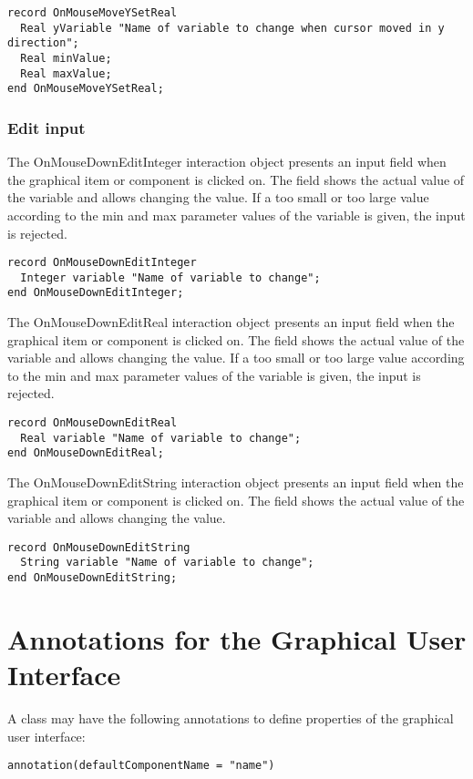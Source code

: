 \begin{lstlisting}[language=modelica]
record OnMouseMoveYSetReal
  Real yVariable "Name of variable to change when cursor moved in y direction";
  Real minValue;
  Real maxValue;
end OnMouseMoveYSetReal;
\end{lstlisting}
\subsubsection{Edit input}

The OnMouseDownEditInteger interaction object presents an input field
when the graphical item or component is clicked on. The field shows the
actual value of the variable and allows changing the value. If a too
small or too large value according to the min and max parameter values
of the variable is given, the input is rejected.

\begin{lstlisting}[language=modelica]
record OnMouseDownEditInteger
  Integer variable "Name of variable to change";
end OnMouseDownEditInteger;
\end{lstlisting}
The OnMouseDownEditReal interaction object presents an input field when
the graphical item or component is clicked on. The field shows the
actual value of the variable and allows changing the value. If a too
small or too large value according to the min and max parameter values
of the variable is given, the input is rejected.

\begin{lstlisting}[language=modelica]
record OnMouseDownEditReal
  Real variable "Name of variable to change";
end OnMouseDownEditReal;
\end{lstlisting}
The OnMouseDownEditString interaction object presents an input field
when the graphical item or component is clicked on. The field shows the
actual value of the variable and allows changing the value.

\begin{lstlisting}[language=modelica]
record OnMouseDownEditString
  String variable "Name of variable to change";
end OnMouseDownEditString;
\end{lstlisting}
\section{Annotations for the Graphical User Interface}

A class may have the following annotations to define properties of the
graphical user interface:
\begin{lstlisting}[language=modelica]
 annotation(defaultComponentName = "name")
\end{lstlisting}

